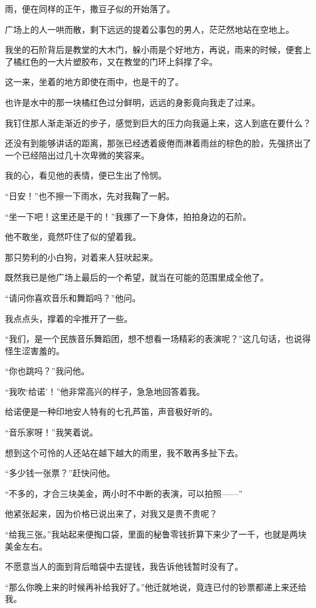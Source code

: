 \par 雨，便在同样的正午，撒豆子似的开始落了。
\par 广场上的人一哄而散，剩下远远的提着公事包的男人，茫茫然地站在空地上。
\par 我坐的石阶背后是教堂的大木门，躲小雨是个好地方，再说，雨来的时候，便套上了橘红色的一大片塑胶布，又在教堂的门环上斜撑了伞。
\par 这一来，坐着的地方即使在雨中，也是干的了。
\par 也许是水中的那一块橘红色过分鲜明，远远的身影竟向我走了过来。
\par 我钉住那人渐走渐近的步子，感觉到巨大的压力向我逼上来，这人到底在要什么？
\par 还没有到能够讲话的距离，那张已经透着疲倦而淋着雨丝的棕色的脸，先强挤出了一个已经陪出过几十次卑微的笑容来。
\par 我的心，看见他的表情，便已生出了怜悯。
\par “日安！”也不擦一下雨水，先对我鞠了一躬。
\par “坐一下吧！这里还是干的！”我挪了一下身体，拍拍身边的石阶。
\par 他不敢坐，竟然吓住了似的望着我。
\par 那只势利的小白狗，对着来人狂吠起来。
\par 既然我已是他广场上最后的一个希望，就当在可能的范围里成全他了。
\par “请问你喜欢音乐和舞蹈吗？”他问。
\par 我点点头，撑着的伞推开了一些。
\par “我们，是一个民族音乐舞蹈团，想不想看一场精彩的表演呢？”这几句话，也说得怪生涩害羞的。
\par “你也跳吗？”我问他。
\par “我吹‘给诺’！”他非常高兴的样子，急急地回答着我。
\par 给诺便是一种印地安人特有的七孔芦笛，声音极好听的。
\par “音乐家呀！”我笑着说。
\par 想到这个可怜的人还站在越下越大的雨里，我不敢再多扯下去。
\par “多少钱一张票？”赶快问他。
\par “不多的，才合三块美金，两小时不中断的表演，可以拍照——”
\par 他紧张起来，因为价格已说出来了，对我又是贵不贵呢？
\par “给我三张。”我站起来便掏口袋，里面的秘鲁零钱折算下来少了一千，也就是两块美金左右。
\par 不愿意当人的面到背后暗袋中去提钱，我告诉他钱暂时没有了。
\par “那么你晚上来的时候再补给我好了。”他迁就地说，竟连已付的钞票都递上来还给我。
